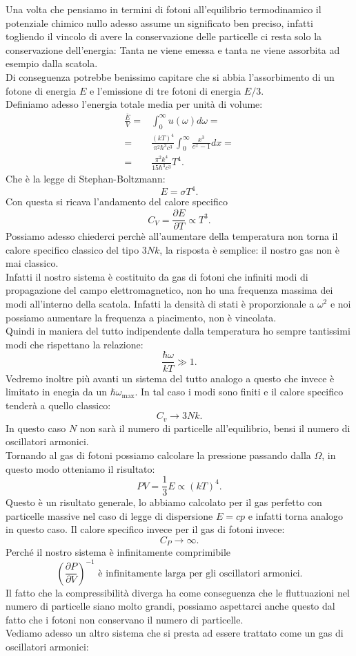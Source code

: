 Una volta che pensiamo in termini di fotoni all'equilibrio termodinamico il potenziale chimico nullo adesso assume un significato ben preciso, infatti togliendo il vincolo di avere la conservazione delle particelle ci resta solo la conservazione dell'energia: Tanta ne viene emessa e tanta ne viene assorbita ad esempio dalla scatola.\\
Di conseguenza potrebbe benissimo capitare che si abbia l'assorbimento di un fotone di energia $E$ e l'emissione di tre fotoni di energia $E /3$.\\
Definiamo adesso l'energia totale media per unità di volume:
\begin{align}
	\frac{\overline{E}}{V}=& \int_{0}^{\infty} u ( \omega ) d\omega  =\\
	=&\frac{\left( kT \right) ^{4}}{\pi^2\hbar^3c^3}\int_{0}^{\infty} \frac{x^3}{e^{x}-1}dx =\\ \label{eq:energia-totale-media-fotoni}
	=&\frac{\pi^2 k^{4}}{15 \hbar^3 c^3}T^{4}
.\end{align}
Che è la legge di Stephan-Boltzmann:
\[
	E = \sigma T^{4}
.\] 
Con questa si ricava l'andamento del calore specifico
\[
	C_{V} = \frac{\partial E}{\partial T} \propto T^{3}
.\] 
Possiamo adesso chiederci perchè all'aumentare della temperatura non torna il calore specifico classico del tipo $3Nk$, la risposta è semplice: il nostro gas non è mai classico.\\
Infatti il nostro sistema è costituito da gas di fotoni che infiniti modi di propagazione del campo elettromagnetico, non ho una frequenza massima dei modi all'interno della scatola. Infatti la densità di stati è proporzionale a $\omega ^2$ e noi possiamo aumentare la frequenza a piacimento, non è vincolata.\\
Quindi in maniera del tutto indipendente dalla temperatura ho sempre tantissimi modi che rispettano la relazione:
\[
	\frac{\hbar\omega }{kT}\gg 1
.\] 
Vedremo inoltre più avanti un sistema del tutto analogo a questo che invece è limitato in enegia da un $\hbar\omega _{\text{max}}$.
In tal caso i modi sono finiti e il calore specifico tenderà a quello classico:
\[
	C_{v} \to 3Nk
.\] 
In questo caso $N$ non sarà il numero di particelle all'equilibrio, bensi il numero di oscillatori armonici.\\
Tornando al gas di fotoni possiamo calcolare la pressione passando dalla $\Omega $, in questo modo otteniamo il risultato:
\[
	PV = \frac{1}{3}E \propto \left( kT \right) ^{4}
.\] 
Questo è un risultato generale, lo abbiamo calcolato per il gas perfetto con particelle massive nel caso di legge di dispersione $E = cp$ e infatti torna analogo in questo caso.
Il calore specifico invece per il gas di fotoni invece:
\[
	C_{P} \to \infty
.\] 
Perché il nostro sistema è infinitamente comprimibile
\[
	\left( \frac{\partial P}{\partial V}  \right) ^{-1} 
	\text{ è infinitamente larga per gli oscillatori armonici}
.\] 
Il fatto che la compressibilità diverga ha come conseguenza che le fluttuazioni nel numero di particelle siano molto grandi, possiamo aspettarci anche questo dal fatto che i fotoni non conservano il numero di particelle.\\
Vediamo adesso un altro sistema che si presta ad essere trattato come un gas di oscillatori armonici:
